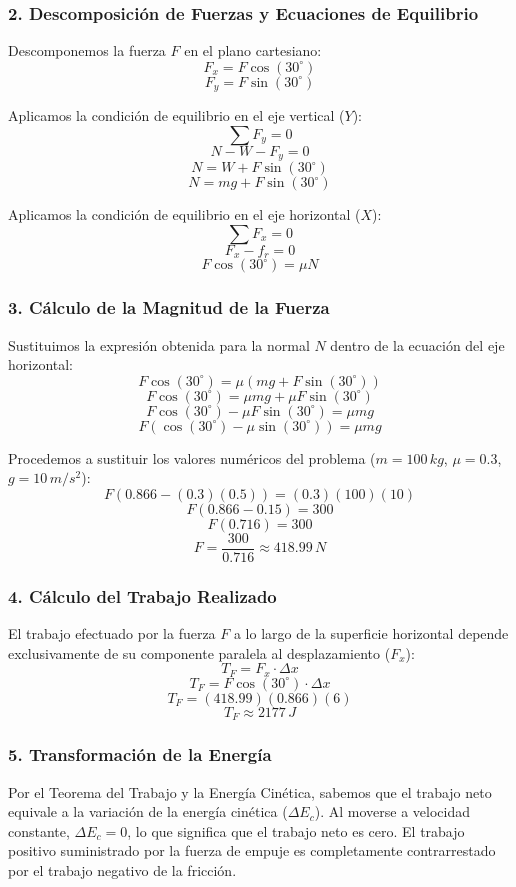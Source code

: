 \documentclass[12pt, a4paper]{article}
\begin{document}
\subsubsection*{2. Descomposición de Fuerzas y Ecuaciones de Equilibrio}
Descomponemos la fuerza $F$ en el plano cartesiano:
$$ F_x = F \cos(30^\circ) $$
$$ F_y = F \sin(30^\circ) $$

Aplicamos la condición de equilibrio en el eje vertical ($Y$):
$$ \sum F_y = 0 $$
$$ N - W - F_y = 0 $$
$$ N = W + F \sin(30^\circ) $$
$$ N = mg + F \sin(30^\circ) $$

Aplicamos la condición de equilibrio en el eje horizontal ($X$):
$$ \sum F_x = 0 $$
$$ F_x - f_r = 0 $$
$$ F \cos(30^\circ) = \mu N $$

\subsubsection*{3. Cálculo de la Magnitud de la Fuerza}
Sustituimos la expresión obtenida para la normal $N$ dentro de la ecuación del eje horizontal:
$$ F \cos(30^\circ) = \mu (mg + F \sin(30^\circ)) $$
$$ F \cos(30^\circ) = \mu mg + \mu F \sin(30^\circ) $$
$$ F \cos(30^\circ) - \mu F \sin(30^\circ) = \mu mg $$
$$ F (\cos(30^\circ) - \mu \sin(30^\circ)) = \mu mg $$

Procedemos a sustituir los valores numéricos del problema ($m = 100 \, \si{kg}$, $\mu = 0.3$, $g = 10 \, \si{m/s^2}$):
$$ F (0.866 - (0.3)(0.5)) = (0.3)(100)(10) $$
$$ F (0.866 - 0.15) = 300 $$
$$ F (0.716) = 300 $$
$$ F = \frac{300}{0.716} \approx 418.99 \, \si{N} $$

\subsubsection*{4. Cálculo del Trabajo Realizado}
El trabajo efectuado por la fuerza $F$ a lo largo de la superficie horizontal depende exclusivamente de su componente paralela al desplazamiento ($F_x$):
$$ T_F = F_x \cdot \Delta x $$
$$ T_F = F \cos(30^\circ) \cdot \Delta x $$
$$ T_F = (418.99)(0.866)(6) $$
$$ T_F \approx 2177 \, \si{J} $$

\subsubsection*{5. Transformación de la Energía}
Por el Teorema del Trabajo y la Energía Cinética, sabemos que el trabajo neto equivale a la variación de la energía cinética ($\Delta E_c$). Al moverse a velocidad constante, $\Delta E_c = 0$, lo que significa que el trabajo neto es cero. El trabajo positivo suministrado por la fuerza de empuje es completamente contrarrestado por el trabajo negativo de la fricción. 
\end{document}
